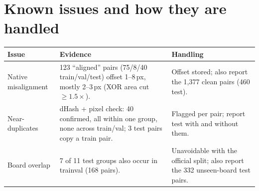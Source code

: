 \documentclass[10pt,a4paper]{article}
\begin{document}
\section{Known issues and how they are handled}
\footnotesize
\begin{tabularx}{\linewidth}{@{}>{\raggedright\arraybackslash}p{2.6cm}L>{\raggedright\arraybackslash}p{6.4cm}@{}}
\toprule
Issue & Evidence & Handling\\
\midrule
Native misalignment & 123 ``aligned'' pairs (75/8/40 train/val/test) offset 1--8\,px, mostly 2--3\,px
(XOR area cut $\geq1.5\times$). & Offset stored; also report the 1,377 clean pairs (460 test).\\
Near-duplicates & dHash + pixel check: 40 confirmed, all within one group, none across train/val; 3 test pairs
copy a train pair. & Flagged per pair; report test with and without them.\\
Board overlap & 7 of 11 test groups also occur in trainval (168 pairs). & Unavoidable with the official split;
also report the 332 unseen-board test pairs.\\
\bottomrule
\end{tabularx}
\normalsize

\end{document}
